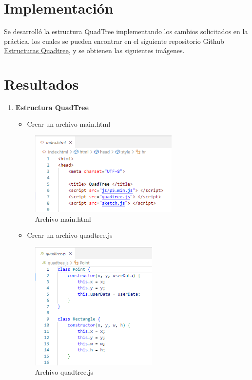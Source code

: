 \documentclass{article}
\begin{document}
\section{Implementación}

  Se desarrolló la estructura QuadTree implementando los cambios solicitados en la práctica, los cuales se pueden encontrar en el siguiente repositorio Github \href{https://github.com/josuemzx/QuadTree_js}{Estructuras Quadtree}, y se obtienen las siguientes imágenes.


\section{Resultados}

    \begin{enumerate}
    
        \item \textbf{Estructura QuadTree}

\begin{itemize}
   \item Crear un archivo main.html
\end{itemize}

\begin{figure}[H]
\centering
\includegraphics[width=0.7\textwidth]{Img/index.png}
\caption{Archivo main.html}
\end{figure}

\begin{itemize}
   \item Crear un archivo quadtree.js
\end{itemize}

\begin{figure}[H]
\centering
\includegraphics[width=0.6\textwidth]{Img/quadtree.png}
\caption{Archivo quadtree.js}
\end{figure}


\end{enumerate}
\end{document}
